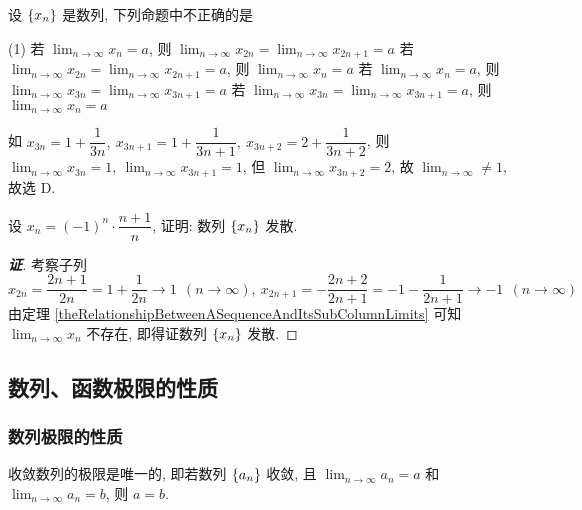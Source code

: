 \begin{example}[2015 数三]
    设 $\qty{x_n}$ 是数列, 下列命题中不正确的是 
    \begin{tasks}(1)
        \task 若 $\displaystyle\lim_{n\to\infty}x_n=a$, 则 $\displaystyle\lim_{n\to\infty}x_{2n}=\lim_{n\to\infty}x_{2n+1}=a$
        \task 若 $\displaystyle\lim_{n\to\infty}x_{2n}=\lim_{n\to\infty}x_{2n+1}=a$, 则 $\displaystyle\lim_{n\to\infty}x_n=a$
        \task 若 $\displaystyle\lim_{n\to\infty}x_n=a$, 则 $\displaystyle\lim_{n\to\infty}x_{3n}=\lim_{n\to\infty}x_{3n+1}=a$
        \task 若 $\displaystyle\lim_{n\to\infty}x_{3n}=\lim_{n\to\infty}x_{3n+1}=a$, 则 $\displaystyle\lim_{n\to\infty}x_n=a$
    \end{tasks}
\end{example}
\begin{solution}
    如 $x_{3n}=1+\dfrac{1}{3n},~x_{3n+1}=1+\dfrac{1}{3n+1},~x_{3n+2}=2+\dfrac{1}{3n+2}$, 则 $\displaystyle\lim_{n\to\infty}x_{3n}=1,~\lim_{n\to\infty}x_{3n+1}=1$, 但 $\displaystyle\lim_{n\to\infty}x_{3n+2}=2$, 故 $\displaystyle\lim_{n\to\infty}\neq 1$, 故选 D.
\end{solution}

\begin{example}
    设 $x_n=(-1)^{n}\cdot\dfrac{n+1}{n}$, 证明: 数列 $\qty{x_n}$ 发散.
\end{example}
\begin{proof}[{\songti \textbf{证}}]
    考察子列
    $$x_{2n}=\dfrac{2n+1}{2n}=1+\dfrac{1}{2n}\to 1~~(n\to\infty),~x_{2n+1}=-\dfrac{2n+2}{2n+1}=-1-\dfrac{1}{2n+1}\to-1~~(n\to\infty)$$
    由定理 \ref{theRelationshipBetweenASequenceAndItsSubColumnLimits} 可知 $\displaystyle\lim_{n\to\infty}x_n$ 不存在, 即得证数列 $\qty{x_n}$ 发散.
\end{proof}

\subsection{数列、函数极限的性质}

\subsubsection{数列极限的性质}

\begin{theorem}[数列极限的唯一性]
    收敛数列的极限是唯一的, 即若数列 $\qty{a_n}$ 收敛, 且 $\displaystyle\lim_{n\to\infty}a_n=a$ 和 $\displaystyle\lim_{n\to\infty}a_n=b$, 则 $a=b$.
\end{theorem}

